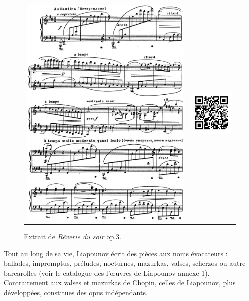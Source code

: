 \begin{figure}[!h]
  \begin{bigcenter}
    \begin{tabular}{lr}
      \includegraphics[width=11.25cm, keepaspectratio]{op3.png}
      &
      \includegraphics[width=3cm, keepaspectratio]{op3-qr.png}
    \end{tabular}
  \end{bigcenter}
  \caption{\label{op3}Extrait de \emph{Rêverie du soir} op.3.}
\end{figure}

Tout au long de sa vie, Liapounov écrit des pièces aux noms évocateurs : ballades, impromptus, préludes, nocturnes, mazurkas, valses, scherzos ou autre barcarolles (voir le catalogue des l'œuvres de Liapounov annexe 1). Contrairement aux valses et mazurkas de Chopin, celles de Liapounov, plus développées, constitues des opus indépendants.

